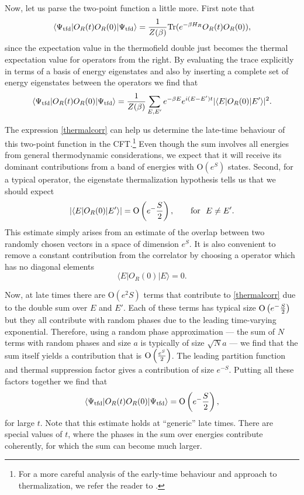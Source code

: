 \documentclass[12pt]{article}
\newcommand{\tfd}{\Psi_{\text{tfd}}} %
\def\tr{{\rm Tr}}
\def\Or[#1]{{\text{O}}\left({#1}\right)}
\newcommand{\be}{\begin{equation}}
\newcommand{\ee}{\end{equation}}
\begin{document}
Now, let us parse the two-point function a little more. First note that 
\be
\langle \tfd | O_R(t) O_R(0) | \tfd \rangle = {1 \over Z(\beta)} \tr(e^{-\beta H_R} O_R(t) O_R(0)),
\ee
since the expectation value in the thermofield double just becomes the thermal expectation value
for operators from the right. By evaluating the trace explicitly in terms of a basis of energy eigenstates and also by inserting a complete
set of energy eigenstates between the operators we find that
\be
\label{thermalcorr}
\langle \tfd | O_R(t) O_R(0) | \tfd \rangle = {1 \over Z(\beta)} \sum_{E, E'} e^{-\beta E} e^{i (E - E') t} |\langle E| O_R(0) | E' \rangle|^2.
\ee

The expression \eqref{thermalcorr} can help us determine the late-time behaviour of this two-point function in the CFT.\footnote{For a more careful analysis of the early-time behaviour and approach to thermalization, we refer the reader to \cite{Banerjee:2019ilw,Mandal:2015kxi,Kulkarni:2018ahv}.} Even though the sum involves all energies from general thermodynamic considerations, we expect that it will receive its dominant contributions from a band of energies with $\Or[e^{S}]$ states.  Second, for a typical operator, the eigenstate thermalization hypothesis \cite{srednicki1994chaos,srednicki1999approach} tells us that we should expect
\be
|\langle E| O_R(0) | E' \rangle| = \Or[e^{-{S \over 2}}], \qquad \text{for}~~E \neq E'.
\ee
This estimate simply arises from an estimate of the overlap between two randomly chosen vectors in a space of dimension $e^{S}$.
It is also convenient to remove a constant contribution from the correlator by choosing a operator which has no diagonal elements
\be
\langle E| O_R(0) | E \rangle = 0.
\ee

Now, at late times there are $\Or[e^{2 S}]$ terms that contribute to \eqref{thermalcorr} due to the double sum over $E$ and $E'$. Each of these terms has typical size $\Or[e^{-{S \over 2}}]$ but they all contribute with random phases due to the leading time-varying exponential. Therefore, using a random phase approximation --- the sum of $N$ terms with random phases and size $a$ is typically of size $\sqrt{N} a$ --- we find that the sum itself yields a contribution that is $\Or[e^{S \over 2}]$.  The leading partition function and thermal suppression factor gives a contribution of size $e^{-S}$. Putting all these factors together we find that
\be
\label{longtimetwopt}
\langle \tfd | O_R(t) O_R(0) | \tfd \rangle  = \Or[e^{-{S \over 2}}],
\ee
for large $t$. Note that this estimate holds at ``generic'' late times. There are special values of $t$, where the phases in the sum over energies contribute coherently, for which the sum can become much larger. 
\end{document}
